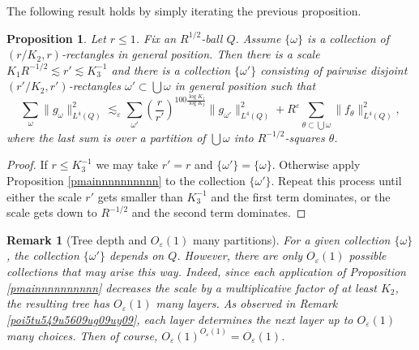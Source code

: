 \documentclass{amsart}%
\numberwithin{equation}{section}
\newtheorem{proposition}[theorem]{Proposition}
\newtheorem{remark}[theorem]{Remark}
\newcommand{\e}{\varepsilon}
\newcommand{\1}{\mathbbm{1}}
\begin{document}
    \smallskip 
	The following result holds by simply iterating the previous proposition.
	\begin{proposition}
	\label{12345}	
		Let $r\le 1$. Fix an $R^{1/2}$-ball $Q$.
        Assume $\{\omega\}$ is a collection of  $(r/K_2,r)$-rectangles in general position. 
        Then there is a scale  $K_1R^{-1/2}\lesssim r'\lesssim K_3^{-1}$ and there is a  collection $\{\omega'\}$ consisting of pairwise disjoint $(r'/K_2,r')$-rectangles  $\omega'\subset \bigcup \omega$ in general position such that 
		$$\sum_{\omega}\|g_\omega\|_{L^4(Q)}^2\lesssim_\e \sum_{\omega'}(\frac{r}{r'})^{100\frac{\log{K_1}}{\log K_2}} \|g_{\omega'}\|_{L^4(Q)}^2+R^\e \sum_{\theta\subset \bigcup \omega}\|f_{\theta}\|_{L^4(Q)}^2,
		$$
		where the last sum is over a partition of $\bigcup \omega$ into $R^{-1/2}$-squares $\theta$.
	\end{proposition}
	\begin{proof}
		If $r\le K_3^{-1}$ we may take $r'=r$ and $\{\omega'\}=\{\omega\}$. Otherwise apply Proposition \ref{pmainnnnnnnnnn} to the collection $\{\omega'\}$. Repeat this process until either the scale $r'$ gets smaller than $K_3^{-1}$ and the first term dominates, or the scale gets down to $R^{-1/2}$ and the second term dominates. \qedhere

	\end{proof}
    \begin{remark}[Tree depth and $O_\e(1)$ many partitions]
    \label{pfuf}
    \rm 
    For a given collection $\{\omega\}$, the collection $\{\omega'\}$ depends on $Q$. However, there are only $O_\e(1)$ possible collections that may arise this way. Indeed, since each application of Proposition \ref{pmainnnnnnnnnn} decreases the scale by a multiplicative factor of at least $K_2$, the resulting tree has $O_\e(1)$ many layers. 
    As observed in Remark \ref{poi5tu549u5609ug09uy09}, each layer determines the next layer up to $O_\e(1)$ many choices. Then of course, $O_\e(1)^{O_\e(1)}=O_\e(1)$. 
	
    \end{remark}		
    
\end{document}
